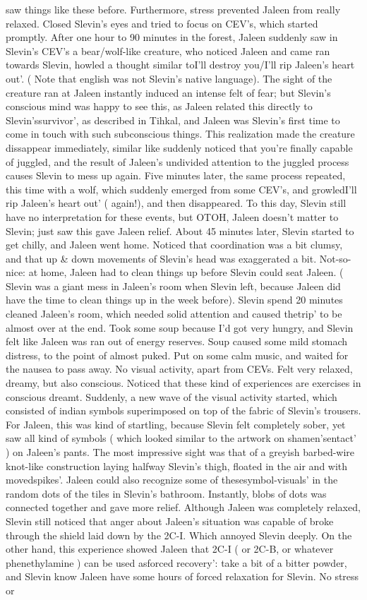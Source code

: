\documentclass[12pt]{book}
\begin{document}
saw things like these before. Furthermore, stress prevented Jaleen from really relaxed. Closed Slevin's eyes and tried to focus on CEV's, which started promptly. After one hour to 90 minutes in the forest, Jaleen suddenly saw in Slevin's CEV's a bear/wolf-like creature, who noticed Jaleen and came ran towards Slevin, howled a thought similar toI'll destroy you/I'll rip Jaleen's heart out'. ( Note that english was not Slevin's native language). The sight of the creature ran at Jaleen instantly induced an intense felt of fear; but Slevin's conscious mind was happy to see this, as Jaleen related this directly to Slevin'ssurvivor', as described in Tihkal, and Jaleen was Slevin's first time to come in touch with such subconscious things. This realization made the creature dissappear immediately, similar like suddenly noticed that you're finally capable of juggled, and the result of Jaleen's undivided attention to the juggled process causes Slevin to mess up again. Five minutes later, the same process repeated, this time with a wolf, which suddenly emerged from some CEV's, and growledI'll rip Jaleen's heart out' ( again!), and then disappeared. To this day, Slevin still have no interpretation for these events, but OTOH, Jaleen doesn't matter to Slevin; just saw this gave Jaleen relief. About 45 minutes later, Slevin started to get chilly, and Jaleen went home. Noticed that coordination was a bit clumsy, and that up \& down movements of Slevin's head was exaggerated a bit. Not-so-nice: at home, Jaleen had to clean things up before Slevin could seat Jaleen. ( Slevin was a giant mess in Jaleen's room when Slevin left, because Jaleen did have the time to clean things up in the week before). Slevin spend 20 minutes cleaned Jaleen's room, which needed solid attention and caused thetrip' to be almost over at the end. Took some soup because I'd got very hungry, and Slevin felt like Jaleen was ran out of energy reserves. Soup caused some mild stomach distress, to the point of almost puked. Put on some calm music, and waited for the nausea to pass away. No visual activity, apart from CEVs. Felt very relaxed, dreamy, but also conscious. Noticed that these kind of experiences are exercises in conscious dreamt. Suddenly, a new wave of the visual activity started, which consisted of indian symbols superimposed on top of the fabric of Slevin's trousers. For Jaleen, this was kind of startling, because Slevin felt completely sober, yet saw all kind of symbols ( which looked similar to the artwork on shamen'sentact' ) on Jaleen's pants. The most impressive sight was that of a greyish barbed-wire knot-like construction laying halfway Slevin's thigh, floated in the air and with movedspikes'. Jaleen could also recognize some of thesesymbol-visuals' in the random dots of the tiles in Slevin's bathroom. Instantly, blobs of dots was connected together and gave more relief. Although Jaleen was completely relaxed, Slevin still noticed that anger about Jaleen's situation was capable of broke through the shield laid down by the 2C-I. Which annoyed Slevin deeply. On the other hand, this experience showed Jaleen that 2C-I ( or 2C-B, or whatever phenethylamine ) can be used asforced recovery': take a bit of a bitter powder, and Slevin know Jaleen have some hours of forced relaxation for Slevin. No stress or 
\end{document}

